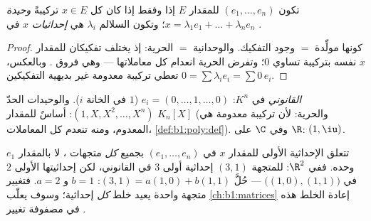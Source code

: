 \begin{proposition}[الإحداثيات]\label{prop:b1:vspaces:coordinates}
تكون $(e_1, \dots, e_n)$  للمقدار $E$ إذا وفقط إذا كان كل $x \in E$
تركيبةً \emph{وحيدة} $x = \lambda_1 e_1 + \dots +
\lambda_n e_n$؛ وتكون السلالم $\lambda_i$ هي
\emph{إحداثيات} $x$ في .
\end{proposition}

\begin{proof}
كونها مولِّدة $=$ وجود التفكيك. والوحدانية $=$
الحرية: إذ يختلف تفكيكان للمقدار $x$ نفسه بتركيبة
تساوي $0$؛ وتفرض الحرية انعدام كل معاملاتها --- وهي
فروق . وبالعكس، تعطي تركيبة معدومة غير بديهية
التفكيكين $0 = \sum \lambda_i
e_i = \sum 0\,e_i$.
\end{proof}

\begin{example}\label{ex:b1:vspaces:bases}
\emph{ القانوني} في $K^n$: $e_i = (0, \dots, 1, \dots, 0)$
($1$ في الخانة $i$). والوحيدات الحدّ $(1, X, X^2, \dots, X^n)$: أساسٌ
للمقدار $K_n[X]$ (والحرية: لأن تركيبة معدومة هي  المعدوم، ومنه
تنعدم كل المعاملات، \cref{def:b1:poly:def}). وفي
$\C$ على $\R$:  $(1, \iu)$.
\end{example}

\begin{remark}
\label{rem:b1:vspaces:teameffort}
تتعلق الإحداثية الأولى للمقدار $x$ في  $(e_1, \dots, e_n)$
بجميع \emph{كل} متجهات ، لا بالمقدار $e_1$ وحده. ففي
$\R^2$: للمتجهة $(3, 1)$ إحداثية أولى $3$ في
 القانوني، لكن إحداثيتها الأولى $2$ في 
$\bigl((1,0), (1,1)\bigr)$ --- حُلَّ $(3,1) = a(1,0) + b(1,1)$:
$b = 1$ و $a = 2$. فتغيير متجهة  واحدة يعيد خلط
\emph{كل} إحداثية؛ وسوف يعلّب \cref{ch:b1:matrices} إعادة
الخلط هذه في مصفوفة تغيير .
\end{remark}

